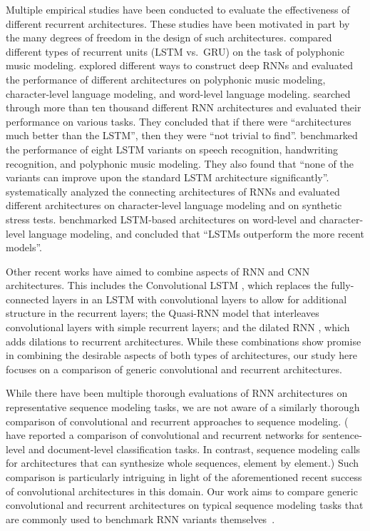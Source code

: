 \documentclass{article}
\begin{document}
Multiple empirical studies have been conducted to evaluate the effectiveness of different recurrent architectures. These studies have been motivated in part by the many degrees of freedom in the design of such architectures. \citet{chung2014empirical} compared different types of recurrent units (LSTM vs.\ GRU) on the task of polyphonic music modeling. \citet{Pascanu2014:ICLR} explored different ways to construct deep RNNs and evaluated the performance of different architectures on polyphonic music modeling, character-level language modeling, and word-level language modeling. \citet{jozefowicz2015empirical} searched through more than ten thousand different RNN architectures and evaluated their performance on various tasks. They concluded that if there were ``architectures much better than the LSTM'', then they were ``not trivial to find''. \citet{greffOdyssey} benchmarked the performance of eight LSTM variants on speech recognition, handwriting recognition, and polyphonic music modeling. They also found that ``none of the variants can improve upon the standard LSTM architecture significantly''. \citet{Zhang2016NIPS} systematically analyzed the connecting architectures of RNNs and evaluated different architectures on character-level language modeling and on synthetic stress tests. \citet{Melis2018} benchmarked LSTM-based architectures on word-level and character-level language modeling, and concluded that ``LSTMs outperform the more recent models''.

Other recent works have aimed to combine aspects of RNN and CNN architectures.  This includes the Convolutional LSTM \cite{xingjian2015convolutional}, which replaces the fully-connected layers in an LSTM with convolutional layers to allow for additional structure in the recurrent layers; the Quasi-RNN model \cite{bradbury2016quasi} that interleaves convolutional layers with simple recurrent layers; and the dilated RNN \cite{chang2017dilated}, which adds dilations to recurrent architectures.  While these combinations show promise in combining the desirable aspects of both types of architectures, our study here focuses on a comparison of generic convolutional and recurrent architectures.

While there have been multiple thorough evaluations of RNN architectures on representative sequence modeling tasks, we are not aware of a similarly thorough comparison of convolutional and recurrent approaches to sequence modeling. (\citet{Yin2017} have reported a comparison of convolutional and recurrent networks for sentence-level and document-level classification tasks. In contrast, sequence modeling calls for architectures that can synthesize whole sequences, element by element.) Such comparison is particularly intriguing in light of the aforementioned recent success of convolutional architectures in this domain. Our work aims to compare generic convolutional and recurrent architectures on typical sequence modeling tasks that are commonly used to benchmark RNN variants themselves~\cite{Hermans2013,leIRNN,jozefowicz2015empirical,Zhang2016NIPS}.
\end{document}
